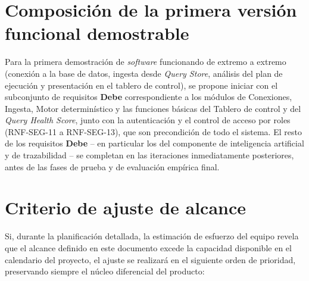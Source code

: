 \documentclass[11pt,a4paper]{report}
\begin{document}
\section{Composici\'on de la primera versi\'on funcional demostrable}

Para la primera demostraci\'on de \textit{software} funcionando de extremo a extremo (conexi\'on a la base de datos, ingesta desde \textit{Query Store}, an\'alisis del plan de ejecuci\'on y presentaci\'on en el tablero de control), se propone iniciar con el subconjunto de requisitos \textbf{Debe} correspondiente a los m\'odulos de Conexiones, Ingesta, Motor determin\'istico y las funciones b\'asicas del Tablero de control y del \textit{Query Health Score}, junto con la autenticaci\'on y el control de acceso por roles (RNF-SEG-11 a RNF-SEG-13), que son precondici\'on de todo el sistema. El resto de los requisitos \textbf{Debe} -- en particular los del componente de inteligencia artificial y de trazabilidad -- se completan en las iteraciones inmediatamente posteriores, antes de las fases de prueba y de evaluaci\'on emp\'irica final.

\section{Criterio de ajuste de alcance}
\label{sec:ajuste-alcance}

Si, durante la planificaci\'on detallada, la estimaci\'on de esfuerzo del equipo revela que el alcance definido en este documento excede la capacidad disponible en el calendario del proyecto, el ajuste se realizar\'a en el siguiente orden de prioridad, preservando siempre el n\'ucleo diferencial del producto:
\end{document}

